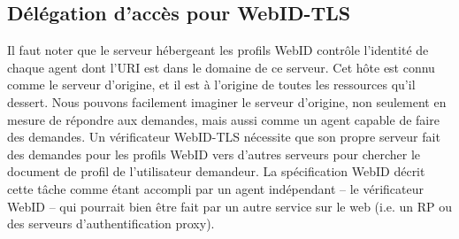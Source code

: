 \documentclass[a4paper]{article}
\begin{document}
\subsection{Délégation d'accès pour WebID-TLS}
\label{sec:webid-delegated-access}
Il faut noter que le serveur hébergeant les profils WebID contrôle l'identité de chaque agent dont l'URI est dans le domaine de ce serveur. Cet hôte est connu comme le serveur d'origine, et il est à l'origine de toutes les ressources qu'il dessert. Nous pouvons facilement imaginer le serveur d'origine, non seulement en mesure de répondre aux demandes, mais aussi comme un agent capable de faire des demandes. Un vérificateur WebID-TLS nécessite que son propre serveur fait des demandes pour les profils WebID vers d'autres serveurs pour chercher le document de profil de l'utilisateur demandeur. La spécification WebID décrit cette tâche comme étant accompli par un agent indépendant -- le vérificateur WebID -- qui pourrait bien être fait par un autre service sur le web (i.e. un RP ou des serveurs d'authentification proxy).\\
\end{document}
